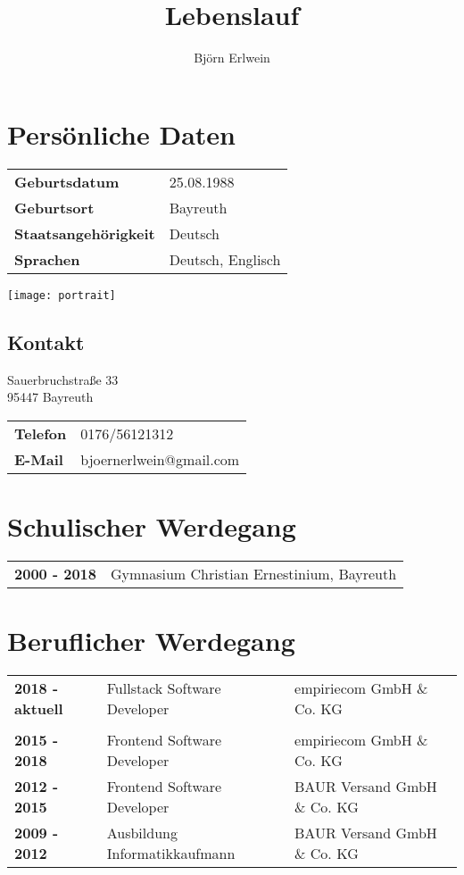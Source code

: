 \documentclass[10pt,ngerman,a4paper]{article}
\title{Lebenslauf}
\author{Björn Erlwein}
\date{\vspace{-5ex}} %
\begin{document}

\maketitle

\section{Persönliche Daten}
\begin{minipage}{0.3\textwidth}
\begin{tabular}{ll}
\textbf{Geburtsdatum} & 25.08.1988\\
\textbf{Geburtsort} & Bayreuth\\
\textbf{Staatsangehörigkeit} & Deutsch\\
\textbf{Sprachen} & Deutsch, Englisch
\end{tabular}
\end{minipage}
\begin{minipage}{0.6\textwidth}
\flushright
\texttt{[image: portrait]}
\end{minipage}
\subsection{Kontakt}

Sauerbruchstraße 33\\
95447 Bayreuth

\begin{tabular}{ll}
\textbf{Telefon} & 0176/56121312\\
\textbf{E-Mail} & bjoernerlwein@gmail.com
\end{tabular}

\section{Schulischer Werdegang}

\begin{tabular}{ll}
\textbf{2000 - 2018} & Gymnasium Christian Ernestinium, Bayreuth
\end{tabular}

\section{Beruflicher Werdegang}

\begin{tabular}{lll}
\textbf{2018 - aktuell} & Fullstack Software Developer & empiriecom GmbH \& Co. KG \\
\\
\textbf{2015 - 2018} & Frontend Software Developer & empiriecom GmbH \& Co. KG \\
\textbf{2012 - 2015} & Frontend Software Developer & BAUR Versand GmbH \& Co. KG\\
\textbf{2009 - 2012} & Ausbildung Informatikkaufmann & BAUR Versand GmbH \& Co. KG
\end{tabular}
\end{document}

